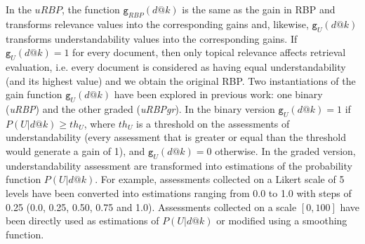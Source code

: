 
%
In the $uRBP$, the function $\mathtt{g}_{RBP}(d@k)$ is the same as the gain in RBP and transforms relevance values into the corresponding gains and, likewise, $\mathtt{g}_{U}(d@k)$ transforms understandability values into the corresponding gains. 
If $\mathtt{g}_{U}(d@k)=1$ for every document, then only topical relevance affects retrieval evaluation, i.e. every document is considered as having equal understandability (and its highest value) and we obtain the original RBP. Two instantiations of the gain function $\mathtt{g}_{U}(d@k)$ have been explored in previous work: one binary (\textit{uRBP}) and the other graded (\textit{uRBPgr}). In the binary version $\mathtt{g}_{U}(d@k) = 1$ if $P(U|d@k) \geq th_U$, where $th_U$ is a threshold on the assessments of understandability (every assessment that is greater or equal than the threshold would generate a gain of 1), and $\mathtt{g}_{U}(d@k)=0$ otherwise. In the graded version, understandability assessment are transformed into estimations of the probability function $P(U|d@k)$.
For example, assessments collected on a Likert scale of 5 levels have been converted into estimations ranging from 0.0 to 1.0 with steps of 0.25 (0.0, 0.25, 0.50, 0.75 and 1.0)\todo{~\cite{}}.
Assessments collected on a scale $[0,100]$ have been directly used as estimations of $P(U|d@k)$ or modified using a smoothing function\todo{~\cite{}}.


